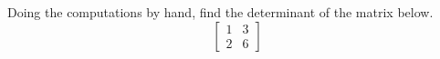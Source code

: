 Doing the computations by hand, find the determinant of the matrix below.
%
\begin{equation*}
\begin{bmatrix}
1 & 3\\ 
2 & 6
\end{bmatrix}
\end{equation*}